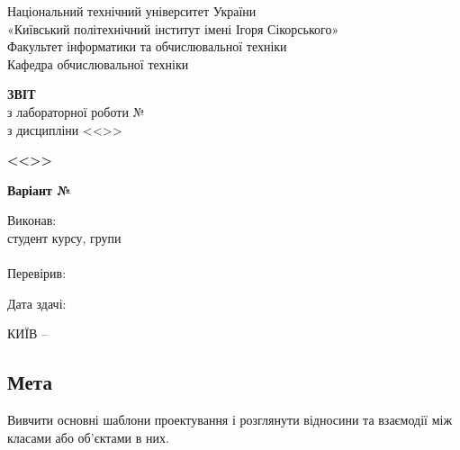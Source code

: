 \documentclass[14pt, a4paper]{extreport}
\begin{document}
	
	\begin{titlepage}
		\begin{center}
			\normalsize
			Національний технічний університет України\\
			«Київський політехнічний інститут імені Ігоря Сікорського» \\[0.5em]
			Факультет інформатики та обчислювальної техніки\\
			Кафедра обчислювальної техніки
			
			\vfill
			
			{\large \textbf{ЗВІТ}\\[0.5em]}
			{з лабораторної роботи №\LabNumber \\}
			{з дисципліни <<\CourseTitle>>}
			
			\vspace{2em}
			
			{\textbf{<<\Topic>>}}
			
			\vspace{1em}
			
			{\textbf{Варіант №\Variant}}
			
			\vfill
			
			\begin{flushright}
				Виконав: \\ студент \CourseNumber{} курсу, групи \StudentGroup \\
				\StudentName \\[1em]
				Перевірив: \\ \Teacher
			\end{flushright}
			
			\vfill
			
			\begin{flushright}
				Дата здачі: \DTMtoday
			\end{flushright}
			
			\vspace{5em}
			КИЇВ -- \ReportYear
		\end{center}
	\end{titlepage}
	
	\clearpage
	\setcounter{page}{2}
	
	\subsection*{Мета} 
	Вивчити основні шаблони проектування і розглянути відносини та взаємодії між класами або об'єктами в них.
	
\end{document}
